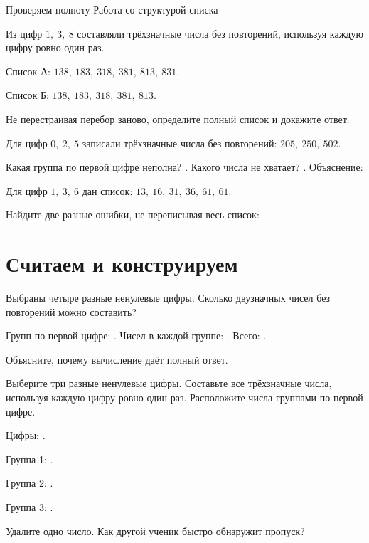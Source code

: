 \worksheettitle
  {Проверяем полноту}
  { Работа со структурой списка}

\studentnameblock

\begin{warningbox}
  Из цифр \(1,\ 3,\ 8\) составляли трёхзначные числа без повторений, используя
  каждую цифру ровно один раз.

  Список А: \(138,\ 183,\ 318,\ 381,\ 813,\ 831\).

  Список Б: \(138,\ 183,\ 318,\ 381,\ 813\).

  Не перестраивая перебор заново, определите полный список и докажите ответ.
\end{warningbox}

\begin{practicebox}
  Для цифр \(0,\ 2,\ 5\) записали трёхзначные числа без повторений:
  \(205,\ 250,\ 502\).

  Какая группа по первой цифре неполна? \answerblank[20mm].
  Какого числа не хватает? \answerblank[20mm].
  Объяснение:
\end{practicebox}

\begin{warningbox}
  Для цифр \(1,\ 3,\ 6\) дан список:
  \(13,\ 16,\ 31,\ 36,\ 61,\ 61\).

  Найдите две разные ошибки, не переписывая весь список:
\end{warningbox}

\newpage
\section{Считаем и конструируем}

\begin{practicebox}
  Выбраны четыре разные ненулевые цифры. Сколько двузначных чисел без
  повторений можно составить?

  Групп по первой цифре: \answerblank[14mm].
  Чисел в каждой группе: \answerblank[14mm].
  Всего: \answerblank[14mm].

  Объясните, почему вычисление даёт полный ответ.
\end{practicebox}

\begin{practicebox}
  Выберите три разные ненулевые цифры. Составьте все трёхзначные числа,
  используя каждую цифру ровно один раз. Расположите числа группами по первой
  цифре.

  Цифры: \answerblank[40mm].

  Группа 1: \answerblank[72mm].

  Группа 2: \answerblank[72mm].

  Группа 3: \answerblank[72mm].

  Удалите одно число. Как другой ученик быстро обнаружит пропуск?
\end{practicebox}

